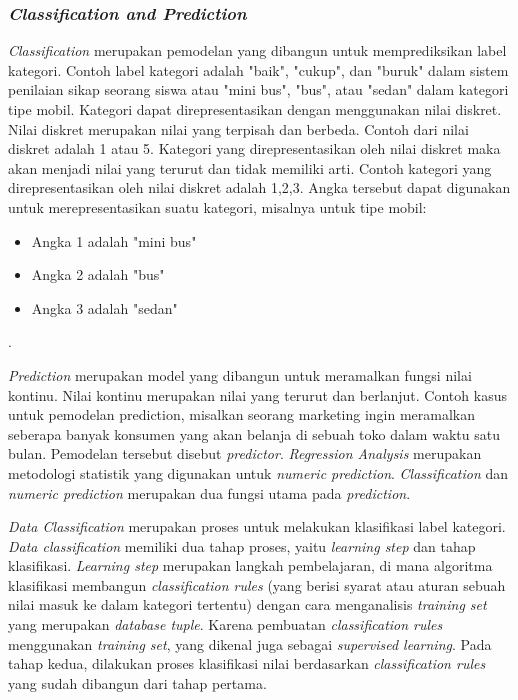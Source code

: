 \subsubsection{\textsl{Classification and Prediction}}
\textsl{Classification} merupakan pemodelan yang dibangun untuk memprediksikan label kategori. Contoh label kategori adalah "baik", "cukup", dan "buruk" dalam sistem penilaian sikap seorang siswa atau "mini bus", "bus", atau "sedan" dalam kategori tipe mobil. Kategori dapat direpresentasikan dengan menggunakan nilai diskret. Nilai diskret merupakan nilai yang terpisah dan berbeda. Contoh dari nilai diskret adalah 1 atau 5. Kategori yang direpresentasikan oleh nilai diskret maka akan menjadi nilai yang terurut dan tidak memiliki arti. Contoh kategori yang direpresentasikan oleh nilai diskret adalah 1,2,3. Angka tersebut dapat digunakan untuk merepresentasikan suatu kategori, misalnya untuk tipe mobil: 
\begin{itemize}
	\item Angka 1 adalah "mini bus"
	\item Angka 2 adalah "bus"
	\item Angka 3 adalah "sedan"
\end{itemize}.

\textsl{Prediction} merupakan model yang dibangun untuk meramalkan fungsi nilai kontinu. Nilai kontinu merupakan nilai yang terurut dan berlanjut. Contoh kasus untuk pemodelan prediction, misalkan seorang marketing ingin meramalkan seberapa banyak konsumen yang akan belanja di sebuah toko dalam waktu satu bulan. Pemodelan tersebut disebut \textsl{predictor}. \textsl{Regression Analysis} merupakan metodologi statistik yang digunakan untuk \textsl{numeric prediction}. \textsl{Classification} dan \textsl{numeric prediction} merupakan dua fungsi utama pada \textsl{prediction}.

\textsl{Data Classification} merupakan proses untuk melakukan klasifikasi label kategori. \textsl{Data classification} memiliki dua tahap proses, yaitu \textsl{learning step} dan tahap klasifikasi. \textsl{Learning step} merupakan langkah pembelajaran, di mana algoritma klasifikasi membangun \textsl{classification rules} (yang berisi syarat atau aturan sebuah nilai masuk ke dalam kategori tertentu) dengan cara menganalisis \textsl{training set} yang merupakan \textsl{database tuple}. Karena pembuatan \textsl{classification rules} menggunakan \textsl{training set}, yang dikenal juga sebagai \textsl{supervised learning}. Pada tahap kedua, dilakukan proses klasifikasi nilai berdasarkan \textsl{classification rules} yang sudah dibangun dari tahap pertama.

